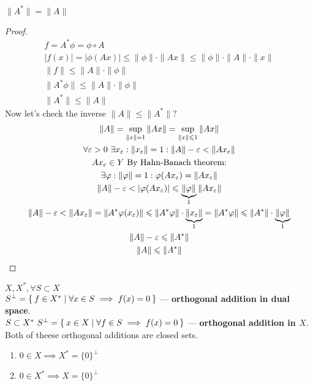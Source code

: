 \begin{stm}
    $\|A^*\| = \|A\|$
\end{stm}

\begin{proof} 
  \begin{gather*}
    f = A^* \phi = \phi \circ A \\
    |f(x)| = |\phi (Ax)| \leq \|\phi\| \cdot \|Ax\| \leq \|\phi\| \cdot \|A\| \cdot \|x\| \\
    \|f\| \leq \|A\| \cdot \|\phi\| \\
    \|A^*\phi\| \leq \|A\| \cdot \|\phi\|\\
    \|A^*\| \leq \|A\|
  \end{gather*}
  Now let's check the inverse $\|A\| \leq \|A^*\|$?
  \begin{gather*}
    \|A\| = \sup_{\|x\| = 1} \|Ax\| = \sup_{\|x\| \leq 1} \|Ax\| \\
    \forall \epsilon > 0\ \exists x_\epsilon : \|x_\epsilon\| = 1 : \|A\| -
    \epsilon < \|A x_\epsilon\| \\
    Ax_\epsilon \in Y\ \text{By Hahn-Banach theorem:} \\
    \exists \phi : \|\phi\| = 1 : \phi(Ax_\epsilon) = \|Ax_\epsilon\| \\
    \|A\| - \epsilon < |\phi(Ax_\epsilon)| \leq \underbrace{\|\phi\|}_{1} \|Ax_\epsilon\| \\
    \|A\| - \epsilon < \|A x_\epsilon\| = \|A^* \phi(x_\epsilon)\| \leq \|A^*
    \phi\| \cdot \underbrace{\|x_\epsilon\|}_{1} = \|A^*\phi\| \leq \|A^*\| \cdot
    \underbrace{\|\phi\|}_{1} \\
    \|A\| - \epsilon \leq \|A^*\| \\
    \|A\| \leq \|A^*\| \qedhere
  \end{gather*}
\end{proof}

\begin{defn}
  $X, X^*, \forall S \subset X$ \\
  $S^\perp = \Set{f \in X^* | \forall x \in S \implies f(x) = 0}$ ---
  \textbf{orthogonal addition in dual space}. \\
  $S \subset X^*\ S^\perp = \Set{x \in X | \forall f \in S \implies f(x) = 0}$
  --- \textbf{orthogonal addition in $X$}.\\
  Both of theese orthogonal additions are closed sets.
\end{defn}

\begin{stm}\leavevmode
  \begin{enumerate}
  \item $0 \in X \implies X^* = \{0\}^\perp$
  \item $0 \in X^* \implies X = \{0\}^\perp$
  \end{enumerate}
\end{stm}

